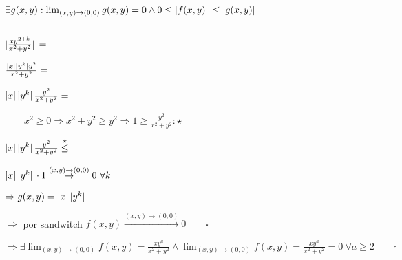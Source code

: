 \documentclass[../parcial.tex]{subfiles}
\begin{document}
\begin{enumerate}
            $ \exists g(x,y): \lim_{(x,y)\to(0,0)} g(x,y) = 0 \wedge 0 \leq \abs*{f(x,y)} \leq \abs*{g(x,y)} $

            $ $

            $ \abs*{\frac{xy^{2+k}}{x^2+y^2}} = $

            $ \frac{\abs*{x}\abs*{y^k}y^2}{x^2+y^2} = $

            $ \abs*{x}\abs*{y^k}\frac{y^2}{x^2+y^2} = $

            $ \qquad x^2 \geq 0 \Rightarrow x^2 + y^2 \geq y^2 \Rightarrow 1 \geq \frac{y^2}{x^2+y^2} : \star $

            $ \abs*{x}\abs*{y^k}\frac{y^2}{x^2+y^2} \stackrel{\star}{\leq} $

            $ \abs*{x}\abs*{y^k} \cdot 1 \stackrel{(x,y)\to(0,0)}{\to} 0\ \forall k$

            $ \Rightarrow g(x,y) = \abs*{x}\abs*{y^k}$

            $ \Rightarrow $ por sandwitch $f(x,y) \stackrel{(x,y)\to(0,0)}{\to} 0 \qquad \square$

    \end{enumerate}

    $ \Rightarrow \exists \lim_{(x,y)\to(0,0)} f(x,y) = \frac{xy^a}{x^2+y^2} \wedge \lim_{(x,y)\to(0,0)} f(x,y) = \frac{xy^a}{x^2+y^2} = 0\ \forall a \geq 2 \qquad\square$
\end{document}
